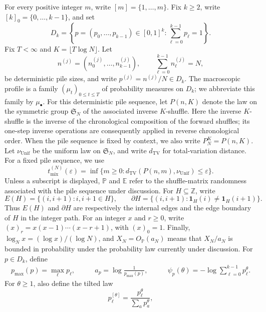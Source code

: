 \documentclass[11pt]{article}
\numberwithin{equation}{section}
\newcommand{\TV}{\mathrm{TV}}
\newcommand{\Unif}{\mathrm{Unif}}
\newcommand{\E}{\mathbb E}
\newcommand{\Pp}{\mathbb P}
\newcommand{\Z}{\mathbb Z}
\newcommand{\1}{\mathbf 1}
\newcommand{\nuUnif}{\nu_{\Unif}}
\begin{document}
For every positive integer $m$, write $[m]=\{1,\ldots,m\}$. Fix $k\ge2$,
write $[k]_0=\{0,\ldots,k-1\}$, and set
\begin{equation}
\label{eq:probability-simplex}
  D_k=\left\{p=(p_0,\ldots,p_{k-1})\in[0,1]^k:
  \sum_{\ell=0}^{k-1}p_\ell=1\right\}.
\end{equation}
Fix $T<\infty$ and $K=\lfloor T\log N\rfloor$. Let
\[
  n^{(j)}=(n^{(j)}_0,\ldots,n^{(j)}_{k-1}),
  \qquad
  \sum_{\ell=0}^{k-1}n^{(j)}_\ell=N,
\]
be deterministic pile sizes, and write $p^{(j)}=n^{(j)}/N\in D_k$. The macroscopic profile is a family $(\mu_t)_{0\le t\le T}$ of probability measures on $D_k$; we abbreviate this family by $\mu_\bullet$.
For this deterministic pile sequence, let $P(n,K)$ denote the law on the
symmetric group $\mathfrak S_N$ of the associated inverse $K$-shuffle. Here the inverse $K$-shuffle is the inverse of the chronological composition of the forward shuffles; its one-step inverse operations are consequently applied in reverse chronological order. When
the pile sequence is fixed by context, we also write $P_N^K=P(n,K)$.
Let $\nuUnif$ be the uniform law on $\mathfrak S_N$, and write $d_{\TV}$ for
total-variation distance. For a fixed pile sequence, we use
\begin{equation}
\label{eq:mixing-time-definition}
  t_{\mathrm{mix}}^{(N)}(\varepsilon)
  =\inf\{m\ge0:d_{\TV}(P(n,m),\nuUnif)\le\varepsilon\}.
\end{equation}
Unless a subscript is displayed, \(\Pp\) and \(\E\) refer to the
shuffle-matrix randomness associated with the pile sequence under discussion.
For $H\subseteq\Z$, write
\[
  E(H)=\{(i,i+1):i,i+1\in H\},
  \qquad
  \partial H=\{(i,i+1):\mathbf 1_H(i)\ne\mathbf 1_H(i+1)\}.
\]
Thus $E(H)$ and $\partial H$ are respectively the internal edges and the
edge boundary of $H$ in the integer path. For an integer $x$ and $r\ge0$,
write $(x)_r=x(x-1)\cdots(x-r+1)$, with $(x)_0=1$. Finally,
$\log_N x=(\log x)/(\log N)$, and $X_N=O_\Pp(a_N)$ means that $X_N/a_N$ is bounded in probability under the
probability law currently under discussion.
For $p\in D_k$, define
\begin{equation}
\label{eq:one-column-costs}
\begin{aligned}
  p_{\max}(p)=\max_\ell p_\ell,
  &\qquad
  a_p=\log\frac1{p_{\max}(p)},
  &\qquad
  \psi_p(\theta)=-\log\sum_{\ell=0}^{k-1}p_\ell^\theta .
\end{aligned}
\end{equation}
For $\theta\ge1$, also define the tilted law
\[
  p^{[\theta]}_\ell=\frac{p_\ell^\theta}{\sum_a p_a^\theta},
\]
\end{document}

